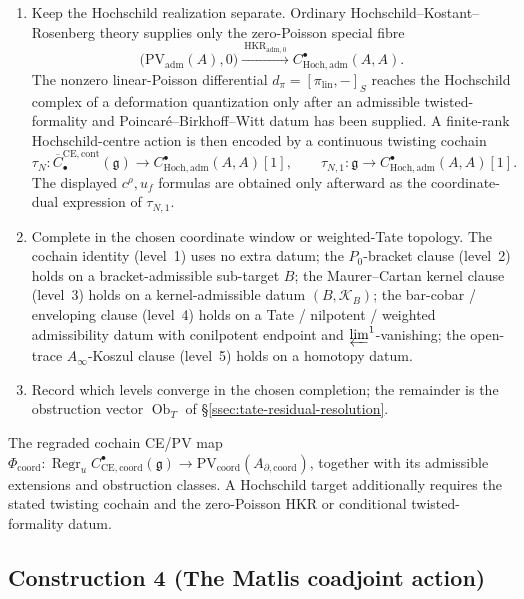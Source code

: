 \begin{description}
\begin{enumerate}
\(d_{\mathrm{CE}}u_f\), not the image of \(c^\rho\).
\item Keep the Hochschild realization separate.  Ordinary
Hochschild--Kostant--Rosenberg theory supplies only the zero-Poisson
special fibre
\[
  \bigl(\mathrm{PV}_{\mathrm{adm}}(A),0\bigr)
  \xrightarrow{\ \operatorname{HKR}_{\mathrm{adm},0}\ }
  C^\bullet_{\mathrm{Hoch},\mathrm{adm}}(A,A).
\]
The nonzero linear-Poisson differential
\(d_\pi=[\pi_{\mathrm{lin}},-]_S\) reaches the Hochschild complex of a
deformation quantization only after an admissible twisted-formality and
Poincar\'e--Birkhoff--Witt datum has been supplied.  A finite-rank
Hochschild-centre action is then encoded by a continuous twisting
cochain
\[
  \tau_N\colon
  \overline C^{\mathrm{CE},\mathrm{cont}}_\bullet(\mathfrak g)
  \longrightarrow
  C^\bullet_{\mathrm{Hoch},\mathrm{adm}}(A,A)[1],
  \qquad
  \tau_{N,1}\colon\mathfrak g\longrightarrow
  C^\bullet_{\mathrm{Hoch},\mathrm{adm}}(A,A)[1].
\]
The displayed \(c^\rho,u_f\) formulas are obtained only afterward as
the coordinate-dual expression of \(\tau_{N,1}\).
\item Complete in the chosen coordinate window or weighted-Tate
topology.  The cochain identity (level~1) uses no extra datum; the
\(P_0\)-bracket clause (level~2) holds on a bracket-admissible
sub-target \(B\); the Maurer--Cartan kernel clause (level~3) holds on
a kernel-admissible datum \((B,\mathcal K_B)\); the bar-cobar /
enveloping clause (level~4) holds on a Tate / nilpotent / weighted
admissibility datum with conilpotent endpoint and
\(\varprojlim^1\)-vanishing; the open-trace \(A_\infty\)-Koszul clause
(level~5) holds on a homotopy datum.
\item Record which levels converge in the chosen completion; the
remainder is the obstruction vector
\(\operatorname{Ob}_T\) of \S\ref{ssec:tate-residual-resolution}.
\end{enumerate}
\item[Result.]  The regraded cochain CE/PV map
\(\Phi_{\mathrm{coord}}\colon
\operatorname{Regr}_u C^\bullet_{\mathrm{CE,coord}}(\mathfrak g)\to
\mathrm{PV}_{\mathrm{coord}}(A_{\partial,\mathrm{coord}})\), together
with its admissible extensions and obstruction classes.  A Hochschild
target additionally requires the stated twisting cochain and the
zero-Poisson HKR or conditional twisted-formality datum.
\end{description}

\subsection*{Construction 4 (The Matlis coadjoint action)}\label{algo:matlis}

